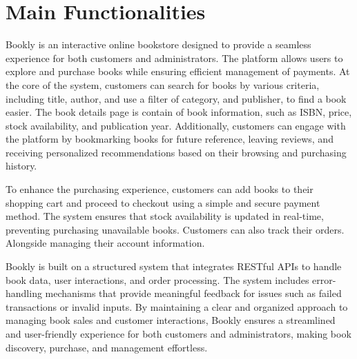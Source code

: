 \section{Main Functionalities}

Bookly is an interactive online bookstore designed to provide a seamless experience for both customers and administrators. The platform allows users to explore and purchase books while ensuring efficient management of payments. At the core of the system, customers can search for books by various criteria, including title, author, and use a filter of category, and publisher, to find a book easier. The book details page is contain of book information, such as ISBN, price, stock availability, and publication year. Additionally, customers can engage with the platform by bookmarking books for future reference, leaving reviews, and receiving personalized recommendations based on their browsing and purchasing history.

To enhance the purchasing experience, customers can add books to their shopping cart and proceed to checkout using a simple and secure payment method. The system ensures that stock availability is updated in real-time, preventing purchasing unavailable books. Customers can also track their orders. Alongside managing their account information.

Bookly is built on a structured system that integrates RESTful APIs to handle book data, user interactions, and order processing. The system includes error-handling mechanisms that provide meaningful feedback for issues such as failed transactions or invalid inputs. By maintaining a clear and organized approach to managing book sales and customer interactions, Bookly ensures a streamlined and user-friendly experience for both customers and administrators, making book discovery, purchase, and management effortless.
